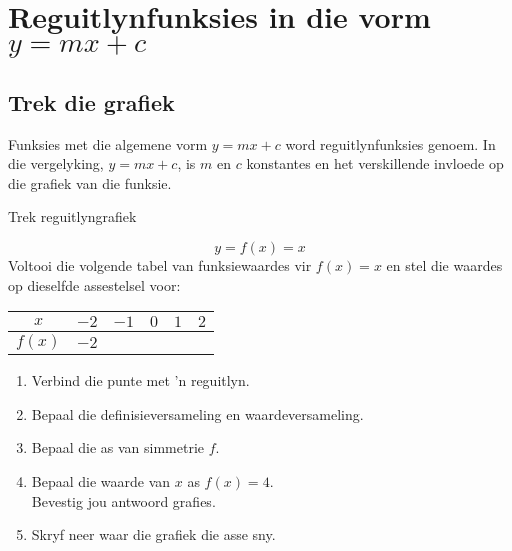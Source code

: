\section{Reguitlynfunksies in die vorm $y=mx+c$}


\subsection*{Trek die grafiek}       
Funksies met die algemene vorm $y=mx+c$ word reguitlynfunksies genoem. In die vergelyking, $y=mx+c$, is $m$ en $c$ konstantes en het verskillende invloede op die grafiek van die funksie. 
\par
{}

\begin{wex}{Trek reguitlyngrafiek}
{
\begin{equation*}
 y = f(x) = x
\end{equation*}
Voltooi die volgende tabel van funksiewaardes vir $f(x)=x$ en stel die waardes op dieselfde assestelsel voor:
\\
\begin{center}
\begin{tabular}{|c|c|c|c|c|c|}
\hline
  $x$ &  $-2$ & $-1$ & $0$ & $1$ & $2$ 
\\ \hline
 $f(x)$& $-2$ & \phantom{$-2$} & \phantom{$-2$} & \phantom{$-2$} & \phantom{$-2$}
\\ \hline
\end{tabular}
\end{center}
\vspace{10pt}
\begin{enumerate}[noitemsep, label=\textbf{\arabic*}. ] 
 \item Verbind die punte met 'n reguitlyn.
\item Bepaal die definisieversameling en waardeversameling.
\item Bepaal die as van simmetrie $f$.
\item Bepaal die waarde van $x$ as $f(x) = 4$. \\Bevestig jou antwoord grafies.
\item Skryf neer waar die grafiek die asse sny.

\end{enumerate}
}
{

}
\end{wex}
